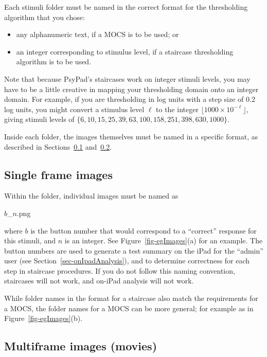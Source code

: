 \documentclass{article}
\begin{document}
Each stimuli folder must be named in
the correct format for the thresholding algorithm that you chose:
\begin{itemize}
    \item any alphanumeric text, if a MOCS is to be used; or
    \item an integer corresponding to stimulus level, if a staircase thresholding algorithm is to be used.
\end{itemize}

Note that because PsyPad's staircases work on integer stimuli levels, you may have to
be a little creative in mapping your thresholding domain onto an integer
domain. For example, if you are thresholding in log units with a
step size of 0.2 log units, you might convert a stimulus level $\ell$ to
the integer $\lfloor 1000\times 10^{-\ell} \rfloor$, giving stimuli levels
of 
$\{6,10,15,25,39,63,100,158,251,398,630,1000\}$.

Inside each folder, the images themselves must be named in a 
specific format, as described in Sections~\ref{sec-single-frame} and~\ref{sec-multi-frame}.

\subsection{Single frame images}
\label{sec-single-frame}

Within the folder, individual images must be named as 
\begin{center}
  $b$\_$n$.png
\end{center}
where $b$ is the button number that would correspond to a ``correct''
response for this stimuli, and $n$ is an integer.
See Figure~\ref{fig-egImages}(a) for an example.
The button numbers are used to generate a test summary on the iPad for 
the ``admin'' user
(see Section~\ref{sec-onIpadAnalysis}), 
and to determine correctness for each step in staircase procedures. 
If you do not follow this naming convention, staircases will not work, and 
on-iPad analysis will not work.

While folder names in the format for a staircase also match the 
requirements for 
a MOCS, the folder names for a MOCS can be more general; for example
as in Figure~\ref{fig-egImages}(b).



\subsection{Multiframe images (movies)}
\label{sec-multi-frame}
\end{document}
